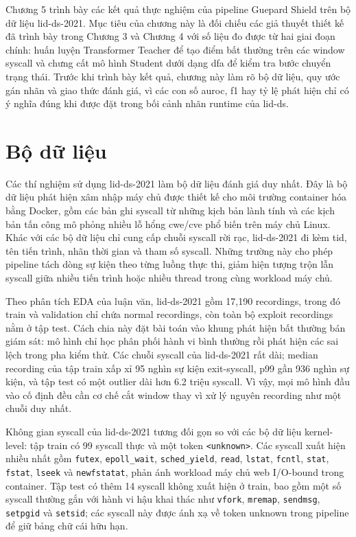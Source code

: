 \documentclass[../main.tex]{subfiles}
\begin{document}
Chương 5 trình bày các kết quả thực nghiệm của pipeline Guepard
Shield trên bộ dữ liệu
\gls{lid-ds}-2021. Mục tiêu của chương này là đối chiếu các giả thuyết
thiết kế đã trình bày
trong Chương 3 và Chương 4 với số liệu đo được từ hai giai đoạn
chính: huấn luyện
Transformer Teacher để tạo điểm bất thường trên các window \gls{syscall} và
chưng cất mô hình
Student dưới dạng \gls{dfa} để kiểm tra bước chuyển trạng thái. Trước khi
trình bày kết quả,
chương này làm rõ bộ dữ liệu, quy ước gán nhãn và giao thức đánh giá,
vì các con số
\gls{auroc}, \gls{f1} hay tỷ lệ phát hiện chỉ có ý nghĩa đúng khi được đặt trong
bối cảnh nhãn
runtime của \gls{lid-ds}.

\section{Bộ dữ liệu}
\label{sec:lidds_dataset}

Các thí nghiệm sử dụng \gls{lid-ds}-2021 \cite{grimmer2022dataset} làm bộ
dữ liệu đánh giá
duy nhất. Đây là bộ dữ liệu phát hiện xâm nhập máy chủ được thiết kế cho môi trường
container hóa bằng Docker, gồm các bản ghi \gls{syscall} từ những kịch bản
lành tính và các
kịch bản tấn công mô phỏng nhiều lỗ hổng \gls{cwe}/\gls{cve} phổ biến trên máy
chủ Linux. Khác với
các bộ dữ liệu chỉ cung cấp chuỗi \gls{syscall} rời rạc, \gls{lid-ds}-2021 đi kèm
\gls{tid}, tên tiến trình, nhãn thời gian và tham số \gls{syscall}.
Những trường này
cho phép pipeline tách dòng sự kiện theo từng luồng thực thi, giảm
hiện tượng trộn lẫn
\gls{syscall} giữa nhiều tiến trình hoặc nhiều thread trong cùng workload máy chủ.

Theo phân tích EDA của luận văn, \gls{lid-ds}-2021 gồm 17,190 recordings,
trong đó train và
validation chỉ chứa normal recordings, còn toàn bộ exploit recordings
nằm ở tập test.
Cách chia này đặt bài toán vào khung phát hiện bất thường bán giám
sát: mô hình chỉ học
phân phối hành vi bình thường rồi phát hiện các sai lệch trong pha
kiểm thử. Các chuỗi
\gls{syscall} của \gls{lid-ds}-2021 rất dài; median recording của tập train xấp
xỉ 95 nghìn sự kiện
exit-\gls{syscall}, p99 gần 936 nghìn sự kiện, và tập test có một outlier
dài hơn 6.2 triệu
\gls{syscall}. Vì vậy, mọi mô hình đầu vào cố định đều cần cơ chế cắt
window thay vì xử lý
nguyên recording như một chuỗi duy nhất.

Không gian \gls{syscall} của \gls{lid-ds}-2021 tương đối gọn so với các bộ dữ
liệu kernel-level:
tập train có 99 \gls{syscall} thực và một token \texttt{<unknown>}. Các
\gls{syscall} xuất hiện
nhiều nhất gồm \texttt{futex}, \texttt{epoll\_wait}, \texttt{sched\_yield},
\texttt{read}, \texttt{lstat}, \texttt{fcntl}, \texttt{stat}, \texttt{fstat},
\texttt{lseek} và \texttt{newfstatat}, phản ánh workload máy chủ web
I/O-bound trong
container. Tập test có thêm 14 \gls{syscall} không xuất hiện ở train, bao
gồm một số \gls{syscall}
thường gắn với hành vi hậu khai thác như \texttt{vfork}, \texttt{mremap},
\texttt{sendmsg}, \texttt{setpgid} và \texttt{setsid}; các \gls{syscall}
này được ánh xạ về
token unknown trong pipeline để giữ bảng chữ cái hữu hạn.
\end{document}
